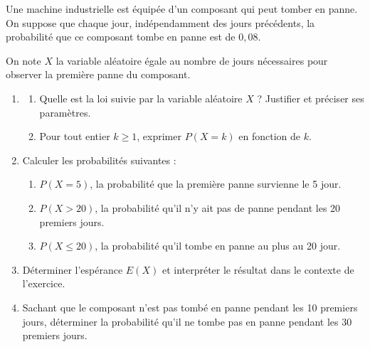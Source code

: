 \documentclass[TC, exos, e,p]{phBook}
\begin{document}
\begin{exercice}
    \begin{enonce}
        Une machine industrielle est équipée d'un composant qui peut tomber en panne. On suppose que chaque jour, indépendamment des jours précédents, la probabilité que ce composant tombe en panne est de $0,08$.

On note $X$ la variable aléatoire égale au nombre de jours nécessaires pour observer la première panne du composant.

\bigskip

\begin{enumerate}
\item
	\begin{enumerate}
		\item Quelle est la loi suivie par la variable aléatoire $X$ ? Justifier et préciser ses paramètres.
		\item Pour tout entier $k \ge 1$, exprimer $P(X = k)$ en fonction de $k$.
	\end{enumerate}

\item Calculer les probabilités suivantes :
	\begin{enumerate}
		\item $P(X = 5)$, la probabilité que la première panne survienne le 5\ieme{} jour.
		\item $P(X > 20)$, la probabilité qu'il n'y ait pas de panne pendant les 20 premiers jours.
		\item $P(X \leq 20)$, la probabilité qu'il tombe en panne au plus au 20\ieme{} jour.
	\end{enumerate}

\item Déterminer l'espérance $E(X)$ et interpréter le résultat dans le contexte de l'exercice.

\item
		Sachant que le composant n'est pas tombé en panne pendant les 10 premiers jours, déterminer la probabilité qu'il ne tombe pas en panne pendant les 30 premiers jours.%




\end{enumerate}
\end{enonce}
\end{exercice}
\end{document}
